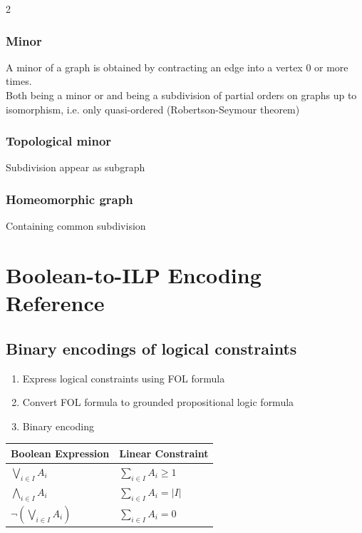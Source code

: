 \documentclass[10pt]{article}
\theoremstyle{definition}
\begin{document}
\begin{multicols*}{2}
\subsubsection*{Minor}
A minor of a graph is obtained by contracting an edge into a vertex 0 or more times.\\
Both being a minor or and being a subdivision of partial orders on graphs up to isomorphism, i.e. only quasi-ordered (Robertson-Seymour theorem)
\subsubsection*{Topological minor}
Subdivision appear as subgraph
\subsubsection*{Homeomorphic graph}
Containing common subdivision



\clearpage

\section{Boolean-to-ILP Encoding Reference}\label{app:boolean}
\subsection{Binary encodings of logical constraints}
\begin{enumerate}
  \item Express logical constraints using FOL formula
  \item Convert FOL formula to grounded propositional logic formula
  \item Binary encoding
\end{enumerate}
\begin{table}[H]
\centering

\begin{tabular}{l l}
\hline
\textbf{Boolean Expression} & \textbf{Linear Constraint} \\
\hline

$\displaystyle \bigvee_{i\in I} A_i$
&
$\displaystyle \sum_{i\in I} A_i \ge 1$
\\[6pt]

$\displaystyle \bigwedge_{i\in I} A_i$
&
$\displaystyle \sum_{i\in I} A_i = |I|$
\\[6pt]

$\displaystyle \neg\left(\bigvee_{i\in I} A_i\right)$
&
$\displaystyle \sum_{i\in I} A_i = 0$
\\[6pt]


\end{tabular}
\end{table}
\end{multicols*}
\end{document}
